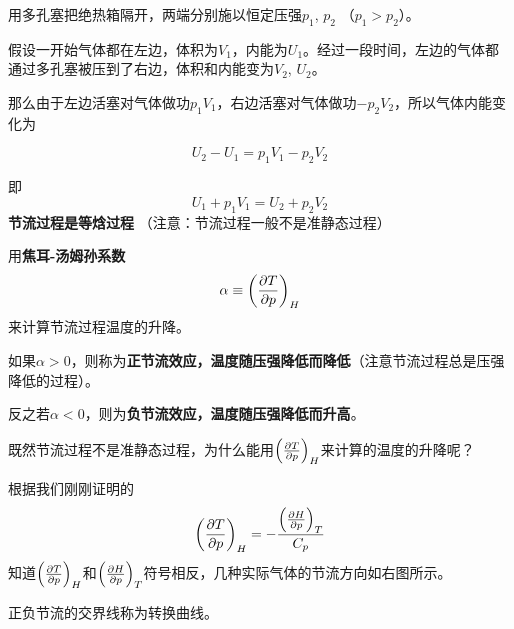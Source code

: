 \documentclass[CJK]{beamer}
\begin{document}
\begin{frame}
\bch

\emini
{}
用多孔塞把绝热箱隔开，两端分别施以恒定压强$p_1$, $p_2$ （$p_1>p_2$）。
\emini

{\small

假设一开始气体都在左边，体积为$V_1$，内能为$U_1$。经过一段时间，左边的气体都通过多孔塞被压到了右边，体积和内能变为$V_2$, $U_2$。

那么由于左边活塞对气体做功$p_1V_1$，右边活塞对气体做功$-p_2V_2$，所以气体内能变化为

$$U_2 - U_1  = p_1V_1 - p_2V_2$$

即
$$ U_1 + p_1V_1 = U_2 + p_2V_2 $$
{\blue \bf 节流过程是等焓过程} （注意：节流过程一般不是准静态过程）

}
\ech
\end{frame}



\begin{frame}
\bch

\bitem
\item{用{\bf 焦耳-汤姆孙系数$$\alpha \equiv \left(\frac{\partial T}{\partial p}\right)_{H}$$}来计算节流过程温度的升降。}
\item{如果$\alpha>0$，则称为{\bf 正节流效应，温度随压强降低而降低}（注意节流过程总是压强降低的过程）。}
\item{反之若$\alpha<0$，则为{\bf 负节流效应，温度随压强降低而升高}。}
\eitem

\ech
\end{frame}

\begin{frame}
\bch
{}

既然节流过程不是准静态过程，为什么能用$\left(\frac{\partial T}{\partial p}\right)_{H}$来计算的温度的升降呢？
\ech
\end{frame}

\begin{frame}
\bch

{
\small

根据我们刚刚证明的
$$\left(\frac{\partial T}{\partial p}\right)_{H} = - \frac{\left(\frac{\partial H}{\partial p}\right)_{T}}{C_p}$$
知道$\left(\frac{\partial T}{\partial p}\right)_{H}$和$\left(\frac{\partial H}{\partial p}\right)_{T}$符号相反，几种实际气体的节流方向如右图所示。

\skipline

正负节流的交界线称为转换曲线。

}
\emini
{}
\emini
\ech
\end{frame}
\end{document}
